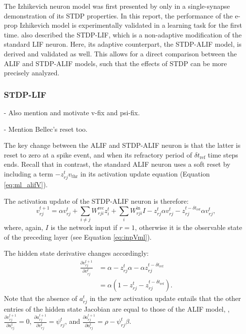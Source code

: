 		The Izhikevich neuron model was first presented by \cite{traub2020learning} only in a single-synapse demonstration of its STDP properties.
		In this report, the performance of the e-prop Izhikevich model is experimentally validated in a learning task for the first time.
		\cite{traub2020learning} also described the STDP-LIF, which is a non-adaptive modification of the standard LIF neuron.
		Here, its adaptive counterpart, the STDP-ALIF model, is derived and validated as well.
		This allows for a direct comparison between the ALIF and STDP-ALIF models, such that the effects of STDP can be more precisely analyzed.

		\subsubsection{STDP-LIF}

			\begin{tcolorbox}[colback=orange]
			- Also mention and motivate v-fix and psi-fix.

			- Mention Bellec's reset too.
			\end{tcolorbox}

			The key change between the ALIF and STDP-ALIF neuron is that the latter is reset to zero at a spike event, and when its refractory period of $\delta t_\text{ref}$ time steps ends.
			Recall that in contrast, the standard ALIF neuron uses a soft reset by including a term $-z^t_{rj}v_\text{thr}$ in its activation update equation (Equation \ref{eq:ml_alifV}).

			The activation update of the STDP-ALIF neuron is therefore:
			\begin{equation}\label{eq:ml_stdpalifV}
	        v^{t+1}_{rj} = \alpha v_{rj}^t + \sum_{i\neq j}W^\text{rec}_{rji}z_i^t + \sum_i W^\text{in}_{rji}I -z^t_{rj}\alpha v^t_{rj} - z_{rj}^{t-\delta t_\text{ref}}\alpha v^t_{rj},
	        \end{equation}
	        where, again, $I$ is the network input if $r=1$, otherwise it is the observable state of the preceding layer (see Equation \ref{eq:inpVml}).

	        The hidden state derivative changes accordingly:
	        \begin{align}
	        \frac{\partial v_{rj}^{t+1}}{\partial v^t_{rj}} &= \alpha - z^t_{rj}\alpha - \alpha z_{rj}^{t-\delta t_\text{ref}}\\
	        &= \alpha\left(1 - z^t_{rj} - z_{rj}^{t-\delta t_\text{ref}}\right).
	        \end{align}
	        Note that the absence of $a^t_{rj}$ in the new activation update entails that the other entries of the hidden state Jacobian are equal to those of the ALIF model, \ie, $\frac{\partial v^{t+1}_{rj}}{\partial a^t_{rj}}=0$, $\frac{\partial a^{t+1}_{rj}}{\partial v^t_{rj}}=\psi^t_{rj}$, and $\frac{\partial a^{t+1}_{rj}}{\partial a^t_{rj}} = \rho - \psi^t_{rj}\beta$.


